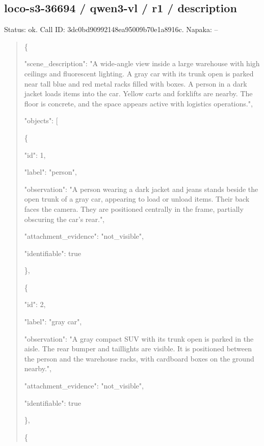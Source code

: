 \documentclass[10pt,a4paper]{article}
\begin{document}
\subsection*{loco-s3-36694 / qwen3-vl / r1 / description}
Status: ok. Call ID: 3dc0bd90992148ea95009b70e1a8916c. Napaka: --
\begin{quote}\footnotesize
\{\par
  "scene\_description":\allowbreak{} "A wide-angle view inside a large warehouse with high ceilings and fluorescent lighting. A gray car with its trunk open is parked near tall blue and red metal racks filled with boxes. A person in a dark jacket loads items into the car. Yellow carts and forklifts are nearby. The floor is concrete,\allowbreak{} and the space appears active with logistics operations.",\allowbreak{}\par
  "objects":\allowbreak{} [\par
    \{\par
      "id":\allowbreak{} 1,\allowbreak{}\par
      "label":\allowbreak{} "person",\allowbreak{}\par
      "observation":\allowbreak{} "A person wearing a dark jacket and jeans stands beside the open trunk of a gray car,\allowbreak{} appearing to load or unload items. Their back faces the camera. They are positioned centrally in the frame,\allowbreak{} partially obscuring the car's rear.",\allowbreak{}\par
      "attachment\_evidence":\allowbreak{} "not\_visible",\allowbreak{}\par
      "identifiable":\allowbreak{} true\par
    \},\allowbreak{}\par
    \{\par
      "id":\allowbreak{} 2,\allowbreak{}\par
      "label":\allowbreak{} "gray car",\allowbreak{}\par
      "observation":\allowbreak{} "A gray compact SUV with its trunk open is parked in the aisle. The rear bumper and taillights are visible. It is positioned between the person and the warehouse racks,\allowbreak{} with cardboard boxes on the ground nearby.",\allowbreak{}\par
      "attachment\_evidence":\allowbreak{} "not\_visible",\allowbreak{}\par
      "identifiable":\allowbreak{} true\par
    \},\allowbreak{}\par
    \{\par

\end{quote}
\end{document}
